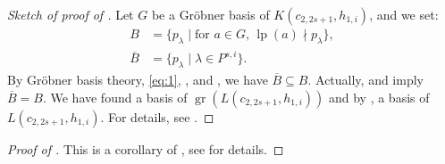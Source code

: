 \documentclass[a4paper, 12pt, reqno]{amsart}
\theoremstyle{remark}
\DeclareMathOperator{\gr}{gr}
\DeclareMathOperator{\lp}{lp}
\begin{document}
\begin{proof}[Sketch of proof of ]
  Let $G$ be a Gröbner basis of $K(c_{2, 2s + 1}, h_{1, i})$, and we set:
  \begin{align*}
    B &= \{p_{\lambda} \mid \text{for $a \in G$, $\lp(a) \nmid p_{\lambda}$}\}, \\
    \overline{B} &= \{p_{\lambda} \mid \lambda \in P^{s, i}\}.
  \end{align*}
  By Gröbner basis theory, \eqref{eq:1}, ,  and , we have $\overline{B} \subseteq B$.
  Actually,  and  imply $\overline{B} = B$.
  We have found a basis of $\gr(L(c_{2, 2s + 1}, h_{1, i}))$ and by , a basis of $L(c_{2, 2s + 1}, h_{1, i})$.
  For details, see \cite{salazar_pbw_2024}.
\end{proof}

\begin{proof}[Proof of ]
  This is a corollary of , see \cite{salazar_pbw_2024} for details.
\end{proof}
\end{document}

